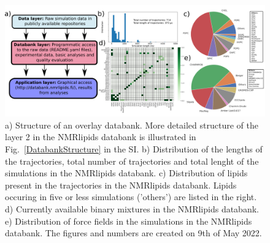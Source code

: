 \documentclass[fleqn,10pt]{wlscirep}
\begin{document}
\begin{figure}
    \centering
    \includegraphics[width = 180mm]{Figures/overlay2.pdf}
    \caption{a) Structure of an overlay databank. 
    More detailed structure of the layer 2 in the NMRlipids databank is illustrated in Fig.~\ref{DatabankStructure} in the SI.
    b) Distribution of the lengths of the trajectories, total number of trajectories and total lenght of the simulations in the NMRlipids databank.
    c) Distribution of lipids present in the trajectories in the NMRlipids databank. Lipids occuring in five or less simulations ('others') are listed in the right. 
    d) Currently available binary mixtures in the NMRlipids databank. 
    e) Distribution of force fields in the simulations in the NMRlipids databank.
    The figures and numbers are created on 9th of May 2022.}
    \label{fig:overlay}
\end{figure}
\end{document}
